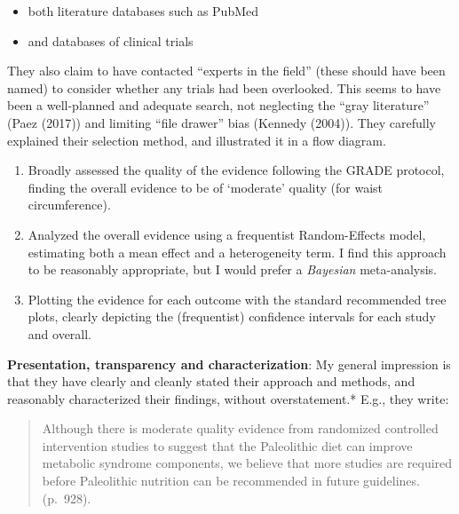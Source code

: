 \documentclass[]{tufte-handout}
\providecommand{\tightlist}{%
  \setlength{\itemsep}{0pt}\setlength{\parskip}{0pt}}
\begin{document}
\begin{itemize}
\tightlist
\item
  both literature databases such as PubMed
\item
  and databases of clinical trials
\end{itemize}

They also claim to have contacted ``experts in the field'' (these should
have been named) to consider whether any trials had been overlooked.
This seems to have been a well-planned and adequate search, not
neglecting the ``gray literature'' (Paez (2017)) and limiting ``file
drawer'' bias (Kennedy (2004)). They carefully explained their selection
method, and illustrated it in a flow diagram.

\begin{enumerate}
\def\labelenumi{\arabic{enumi}.}
\setcounter{enumi}{2}
\item
  Broadly assessed the quality of the evidence following the GRADE
  protocol, finding the overall evidence to be of `moderate' quality
  (for waist circumference).
\item
  Analyzed the overall evidence using a frequentist Random-Effects
  model, estimating both a mean effect and a heterogeneity term. I find
  this approach to be reasonably appropriate, but I would prefer a
  \emph{Bayesian} meta-analysis.
\item
  Plotting the evidence for each outcome with the standard recommended
  tree plots, clearly depicting the (frequentist) confidence intervals
  for each study and overall.
\end{enumerate}

\textbf{Presentation, transparency and characterization}: My general
impression is that they have clearly and cleanly stated their approach
and methods, and reasonably characterized their findings, without
overstatement.* E.g., they write:

\begin{quote}
Although there is moderate quality evidence from randomized controlled
intervention studies to suggest that the Paleolithic diet can improve
metabolic syndrome components, we believe that more studies are required
before Paleolithic nutrition can be recommended in future guidelines.
(p.~928).
\end{quote}

\end{document}
